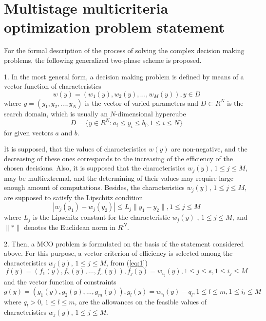 \documentclass[runningheads]{llncs}
\begin{document}
\section{Multistage multicriteria optimization problem statement}	
\label{sec:02}
For the formal description of the process of solving the complex decision making problems, the following generalized two-phase scheme is proposed.

1.	In the most general form, a decision making problem is defined by means of a vector function of characteristics 
\begin{equation}\label{eq:1}
	w(y)=(w_1(y), w_2(y), \dots, w_M (y)), y \in D
\end{equation}
where $y=(y_1,y_2,\dots, y_N )$ is the vector of varied parameters and $D \subset R^N$ is the search domain, which is usually an $N$-dimensional hypercube
\begin{equation}\label{eq:2}
	D=\{y \in R^N:a_i \leq y_i \leq b_i,1 \leq i \leq N\}
\end{equation}
for given vectors $a$ and $b$. 

It is supposed, that the values of characteristics $w(y)$ are non-negative, and the decreasing of these ones corresponds to the increasing of the efficiency of the chosen decisions. Also, it is supposed that the characteristics $w_j (y)$, $1 \leq j \leq M$, may be multiextremal, and the determining of their values may require large enough amount of computations. Besides, the characteristics $w_j (y)$, $1 \leq j \leq M$, are supposed to satisfy the Lipschitz condition
\begin{equation}\label{eq:3}
	|w_j (y_1 )-w_j (y_2 )| \leq L_j \|y_1-y_2 \|, 1 \leq j \leq M
\end{equation}
where $L_j$ is the Lipschitz constant for the characteristic $w_j(y)$ , $1 \leq j \leq M$, and $\|*\|$ denotes the Euclidean norm in $R^N$. 

2.	Then, a MCO problem is formulated on the basis of the statement considered above. For this purpose, a vector criterion of efficiency is selected among the characteristics $w_j (y)$, $1 \leq j \leq M$, from (\ref{eq:1}) 
\begin{equation}\label{eq:4}
	f(y)=(f_1 (y),f_2 (y),\dots,f_s (y)), f_j (y)=w_{i_j} (y), 1\leq j \leq s, 1\leq i_j \leq M
\end{equation}
and the vector function of constraints
\begin{equation}\label{eq:5}
	g(y)=(g_1 (y),g_2 (y),\dots,g_m (y)), g_l (y)=w_{i_l} (y)-q_l, 1\leq l\leq m, 1 \leq i_l \leq M
\end{equation}
where $q_l>0$, $1 \leq l \leq m$, are the allowances on the feasible values of characteristics $w_j (y)$, $1 \leq j \leq M$.
\end{document}
